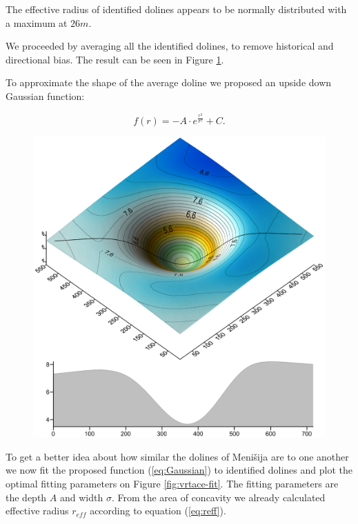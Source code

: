 \documentclass[a0,portrait]{a0poster}
\begin{document}
\begin{multicols}{2}
\vspace{5mm}
The effective radius of identified dolines appears to be normally distributed with a maximum at $26m$.

We proceeded by averaging all the identified dolines, to remove historical and directional bias. The result can be seen in Figure \ref{fig:vrtaca}.

To approximate the shape of the average doline we proposed an upside down Gaussian function:

\begin{equation}
  f(r) = - A \cdot e^{\frac{r^2}{\sigma^2}} + C.
  \label{eq:Gaussian}
\end{equation}

\vfill
\columnbreak
\begin{figure}
  \includegraphics[width=\linewidth]{menisija-vrtaca.png}
  \label{fig:vrtaca}
\end{figure}

To get a better idea about how similar the dolines of Menišija are to one another we now fit the proposed function (\ref{eq:Gaussian}) to identified dolines and plot the optimal fitting parameters on Figure \ref{fig:vrtace-fit}. The fitting parameters are the depth $A$ and width $\sigma$. From the area of concavity we already calculated effective radius $r_{eff}$ according to equation (\ref{eq:reff}).



\end{multicols}
\end{document}
